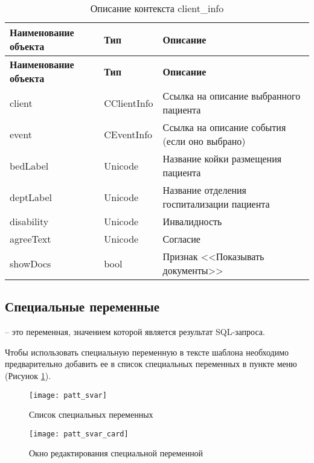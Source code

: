 {\small
\begin{longtable}{|p{4.1cm}|p{5cm}|p{7.5cm}|}
\caption{Описание контекста client\_info \label{tbl_patt_prn_cl}} \\
\hline \rule{0pt}{15pt} \centering \textbf{Наименование объекта} & \centering \textbf{Тип} & \hfil \textbf{Описание} \\ \hline
\endfirsthead
\hline \rule{0pt}{15pt} \centering \textbf{Наименование объекта} & \centering \textbf{Тип} & \hfil \textbf{Описание} \\ \hline
\endhead
client	& CClientInfo	& Ссылка на описание выбранного пациента \\ \hline
event &	CEventInfo	& Ссылка на описание события (если оно выбрано) \\ \hline
bedLabel	& Unicode &	Название койки размещения пациента \\ \hline
deptLabel	& Unicode &	Название отделения госпитализации пациента \\ \hline
disability	& Unicode &	Инвалидность \\ \hline
agreeText	& Unicode &	Согласие \\ \hline
showDocs	& bool	& Признак <<Показывать документы>> \\ \hline
\end{longtable}
}

\subsection{Специальные переменные} \label{patt_svar}

 – это переменная, значением которой является результат SQL-запроса.

Чтобы использовать специальную переменную в тексте шаблона необходимо предварительно добавить ее в список специальных переменных в пункте меню  (Рисунок \ref{img_patt_svar}).

\begin{figure}[ht]\centering
 \texttt{[image: patt\_svar]}
 \caption{Список специальных переменных}
 \label{img_patt_svar}
\end{figure}

\begin{figure}[ht]\centering
 \texttt{[image: patt\_svar\_card]}
 \caption{Окно редактирования специальной переменной}
 \label{img_patt_svar_card}
\end{figure}

